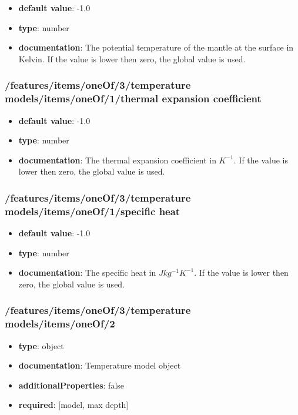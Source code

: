 \begin{itemize}\item {\bf default value}: -1.0
\item {\bf type}: number
\item {\bf documentation}: The potential temperature of the mantle at the surface in Kelvin. If the value is lower then zero, the global value is used.
\end{itemize}\subsubsection{/features/items/oneOf/3/temperature models/items/oneOf/1/thermal expansion coefficient}
\begin{itemize}\item {\bf default value}: -1.0
\item {\bf type}: number
\item {\bf documentation}: The thermal expansion coefficient in $K^{-1}$. If the value is lower then zero, the global value is used.
\end{itemize}\subsubsection{/features/items/oneOf/3/temperature models/items/oneOf/1/specific heat}
\begin{itemize}\item {\bf default value}: -1.0
\item {\bf type}: number
\item {\bf documentation}: The specific heat in $J kg^{-1} K^{-1}$. If the value is lower then zero, the global value is used.
\end{itemize}\subsubsection{/features/items/oneOf/3/temperature models/items/oneOf/2}
\begin{itemize}\item {\bf type}: object
\item {\bf documentation}: Temperature model object
\item {\bf additionalProperties}: false
\item {\bf required}: [model, max depth]\end{itemize}
